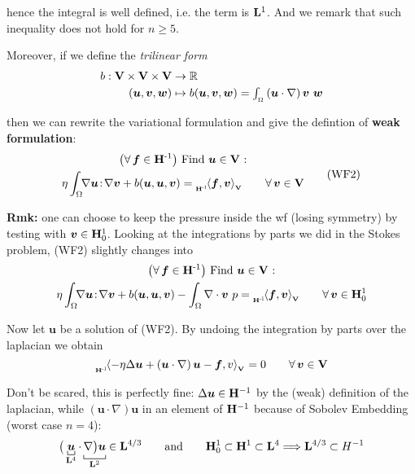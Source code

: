 hence the integral is well defined, i.e. the term is $\mathbf{L}^1$. {\color{purple} And we remark that such inequality does not hold for $n\geq 5$.}

\smallskip

Moreover, if we define the \emph{trilinear form}
\begin{align*}
b:\mathbf{V}\times \mathbf{V} \times \mathbf{V} &\to \mathbb{R} \\
(\bm u, \bm v, \bm w) &\mapsto b (\bm u, \bm v, \bm w) = \textstyle\int_{_\Omega} \left( \bm u\cdot\nabla \right) \bm v\ \bm w
\end{align*}

then we can rewrite the variational formulation and give the defintion of \textbf{weak formulation}:
\begin{equation*}
\begin{gathered}
\big(\forall\,\bm f\in\Hv^{\text{-}1}\big)\text{ Find }\bm u\in \Vv\text{ :} \\ 
\eta\int_\Omega\!\! \nabla \bm u\! :\! \nabla \bm v+b(\bm u,\bm u,\bm v)=\dualV{\bm f,\bm v}{\Hv}{-1} \qquad \forall\, \bm v\in\Vv    
\end{gathered}
\tag{WF2}
\end{equation*}

\textbf{Rmk:} one can choose to keep the pressure inside the wf (losing symmetry) by testing with $\bm v \in \mathbf{H}^1_0$. Looking at the integrations by parts we did in the Stokes problem, (WF2) slightly changes into
\begin{equation*}
\begin{gathered}
\big(\forall\,\bm f\in\Hv^{\text{-}1}\big)\text{ Find }\bm u\in \Vv\text{ :} \\ 
\eta\int_\Omega\!\! \nabla \bm u\! :\! \nabla \bm v+b(\bm u,\bm u,\bm v)-\int_\Omega \nabla\cdot \bm v\ p=\dualV{\bm f,\bm v}{\Hv}{-1} \qquad \forall\, \bm v\in\Hv^1_0    
\end{gathered}
\end{equation*}

\noindent\rlap{\rule[1.5ex]{0.495\textwidth}{.2pt}}\vspace{-0.5em}

Now let $\bm u$ be a solution of (WF2). By undoing the integration by parts over the laplacian we obtain
\begin{equation}
\label{eq:dual-stop}
\dualV{-\eta\Delta\bm u+ \left( \bm u\cdot\nabla \right)\bm u-\bm f,v}{\Hv}{-1}=0\qquad\forall\, \bm v\in\Vv
\end{equation}

Don't be scared, this is perfectly fine: $\Delta\bm u\in\mathbf{H}^{-1}$ by the (weak) definition of the laplacian, while $\left( \bm u\cdot\nabla \right)\bm u$ in an element of $\mathbf{H}^{-1}$ because of Sobolev Embedding (worst case $n=4$):
\begin{equation*}
\big( \underbracket[0.5pt]{\bm u}_{\Lv^4}\cdot \underbracket[0.5pt]{\nabla \big) \bm u}_{\Lv^2} \in \Lv^{4/3}\qquad\text{and}\qquad \Hv_0^1\subset\Hv^1\subset \Lv^4 \Longrightarrow \Lv^{4/3}\subset H^{-1}
\end{equation*}


